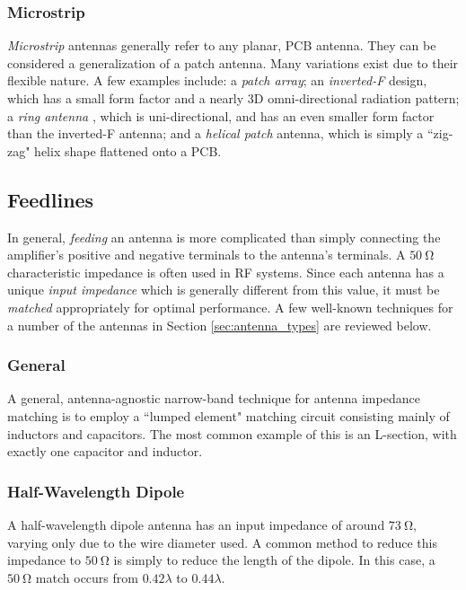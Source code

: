 \subsubsection{Microstrip}
\textit{Microstrip} antennas generally refer to any planar, PCB antenna. They can be considered a generalization of a patch antenna. Many variations exist due to their flexible nature. A few examples include: a \textit{patch array}; an \textit{inverted-F} design, which has a small form factor and a nearly 3D omni-directional radiation pattern; a \textit{ring antenna} \cite{paper-lowProfileRingAntenna}, which is uni-directional, and has an even smaller form factor than the inverted-F antenna; and a \textit{helical patch} antenna, which is simply a ``zig-zag" helix shape flattened onto a PCB.

\subsection{Feedlines}
In general, \textit{feeding} an antenna is more complicated than simply connecting the amplifier's positive and negative terminals to the antenna's terminals. A $\SI{50}{\ohm}$ characteristic impedance is often used in RF systems. Since each antenna has a unique \textit{input impedance} which is generally different from this value, it must be \textit{matched} appropriately for optimal performance. A few well-known techniques for a number of the antennas in Section \ref{sec:antenna_types} are reviewed below.

\subsubsection{General}
A general, antenna-agnostic narrow-band technique for antenna impedance matching is to employ a ``lumped element" matching circuit consisting mainly of inductors and capacitors. The most common example of this is an L-section, with exactly one capacitor and inductor.

\subsubsection{Half-Wavelength Dipole}
A half-wavelength dipole antenna has an input impedance of around $\SI{73}{\ohm}$, varying only due to the wire diameter used. A common method to reduce this impedance to $\SI{50}{\ohm}$ is simply to reduce the length of the dipole. In this case, a $\SI{50}{\ohm}$ match occurs from $0.42\lambda$ to $0.44\lambda$. \cite{textbook-antennaTheoryAnalysisDesign}

